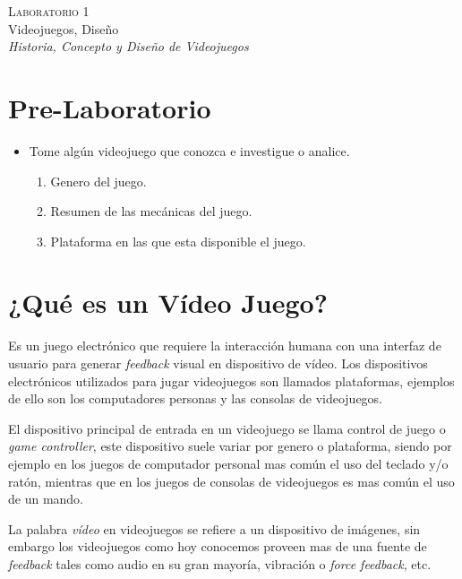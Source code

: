 \begin{center}
\textsc{\Large Laboratorio 1}~\\
{\large Videojuegos, Diseño}~\\
\emph{Historia, Concepto y Diseño de Videojuegos}
\end{center}

\section{Pre-Laboratorio}
\begin{itemize}
\item Tome algún videojuego que conozca e investigue o analice.
\begin{enumerate}
  \item Genero del juego.
  \item Resumen de las mecánicas del juego.
  \item Plataforma en las que esta disponible el juego.
\end{enumerate}
\end{itemize}
\section{¿Qué es un Vídeo Juego?}
Es un juego electrónico que requiere la interacción humana con una interfaz de usuario para generar \emph{feedback} visual en dispositivo de vídeo. Los dispositivos electrónicos utilizados para jugar videojuegos son llamados plataformas, ejemplos de ello son los computadores personas y las consolas de videojuegos.

El dispositivo principal de entrada en un videojuego se llama control de juego o \emph{game controller}, este dispositivo suele variar por genero o plataforma, siendo por ejemplo en los juegos de computador personal mas común el uso del teclado y/o ratón, mientras que en los juegos de consolas de videojuegos es mas común el uso de un mando.

La palabra \emph{vídeo} en videojuegos se refiere a un dispositivo de imágenes, sin embargo los videojuegos como hoy conocemos proveen mas de una fuente de \emph{feedback} tales como audio en su gran mayoría, vibración o \emph{force feedback}, etc.


